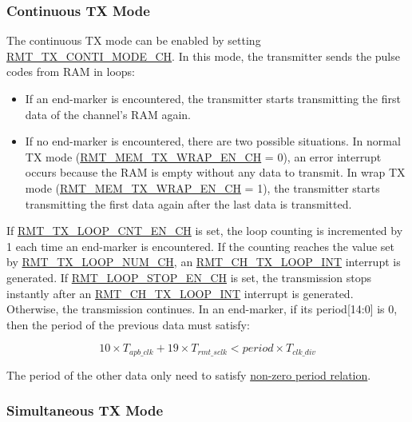 \documentclass[main\_\_EN.tex]{subfiles}
\begin{document}
\subsubsection{Continuous TX Mode}

The continuous TX mode can be enabled by setting \hyperref[fielddesc:RMTTXCONTIMODECHN]{RMT\_TX\_CONTI\_MODE\_CH}. In this mode, the transmitter sends the pulse codes from RAM in loops:
\begin{itemize}
    \item If an end-marker is encountered, the transmitter starts transmitting the first data of the channel's RAM again. 
    \item If no end-marker is encountered, there are two possible situations. In normal TX mode (\hyperref[fielddesc:RMTMEMTXWRAPENCHN]{RMT\_MEM\_TX\_WRAP\_EN\_CH} = 0), an error interrupt occurs because the RAM is empty without any data to transmit. In wrap TX mode (\hyperref[fielddesc:RMTMEMTXWRAPENCHN]{RMT\_MEM\_TX\_WRAP\_EN\_CH} = 1), the transmitter starts transmitting the first data again after the last data is transmitted.
\end{itemize}

If \hyperref[fielddesc:RMTTXLOOPCNTENCHN]{RMT\_TX\_LOOP\_CNT\_EN\_CH} is set, the loop counting is incremented by 1 each time an end-marker is encountered. If the counting reaches the value set by \hyperref[fielddesc:RMTTXLOOPNUMCHN]{RMT\_TX\_LOOP\_NUM\_CH}, an \hyperref[int:RMTCHnTXLOOPINT]{RMT\_CH\_TX\_LOOP\_INT} interrupt is generated. If \hyperref[fielddesc:RMTLOOPSTOPENCHN]{RMT\_LOOP\_STOP\_EN\_CH} is set, the transmission stops instantly after an \hyperref[int:RMTCHnTXLOOPINT]{RMT\_CH\_TX\_LOOP\_INT} interrupt is generated. Otherwise, the transmission continues. In an end-marker, if its period[14:0] is 0, then the period of the previous data must satisfy:

\begin{equation}
10 \times T_{apb\_clk} + 19 \times T_{rmt\_sclk} < period \times T_{clk\_div}
\end{equation}

The period of the other data only need to satisfy \hyperref[eq:rmt-period-value]{non-zero period relation}.


\subsubsection{Simultaneous TX Mode}
\end{document}

